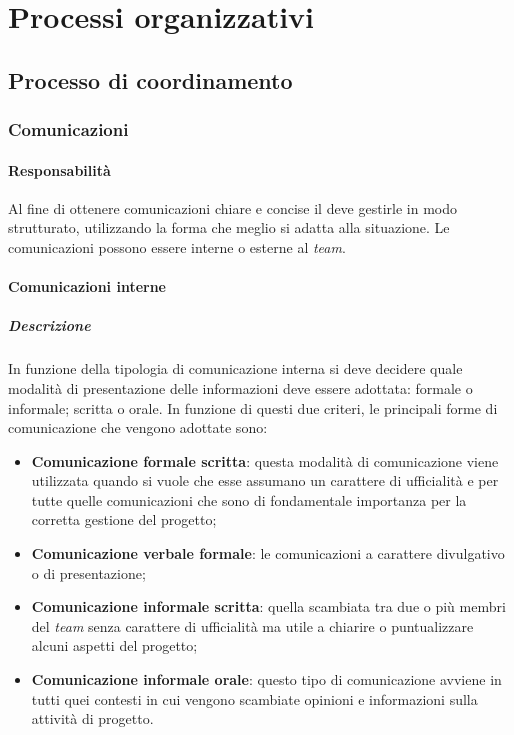 
\section{Processi organizzativi}

\subsection{Processo di coordinamento}
\subsubsection{Comunicazioni}
\paragraph{Responsabilità}
Al fine di ottenere comunicazioni chiare e concise il \textit{\RdP} deve gestirle in modo strutturato, utilizzando la forma che meglio si adatta alla situazione.
Le comunicazioni possono essere interne o esterne al \textit{team}.
\paragraph{Comunicazioni interne}
\subparagraph{Descrizione}
In funzione della tipologia di comunicazione interna si deve decidere quale modalità di presentazione delle informazioni deve essere adottata: formale o informale; scritta o orale.
In funzione di questi due criteri, le principali forme di comunicazione che vengono adottate sono:
\begin{itemize}
\item
\textbf{Comunicazione formale scritta}: questa modalità di comunicazione viene utilizzata quando si 
vuole che esse assumano un carattere di ufficialità e per tutte quelle comunicazioni che sono di fondamentale importanza per la corretta gestione del progetto;
\item
\textbf{Comunicazione verbale formale}: le comunicazioni a carattere divulgativo o di presentazione;
\item
\textbf{Comunicazione informale scritta}: quella scambiata tra due o più membri del \textit{team} senza carattere di ufficialità ma utile a chiarire o puntualizzare alcuni aspetti del progetto;
\item
\textbf{Comunicazione informale orale}: questo tipo di comunicazione avviene in tutti quei contesti in cui vengono scambiate opinioni e informazioni sulla attività di progetto.
\end{itemize}

